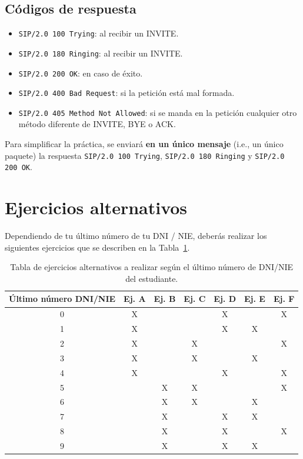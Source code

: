 \documentclass[a4paper,11pt]{article}
\begin{document}
\subsection*{Códigos de respuesta}

   \begin{itemize}
     \item \texttt{SIP/2.0 100 Trying}: al recibir un INVITE.
     \item \texttt{SIP/2.0 180 Ringing}: al recibir un INVITE.
     \item \texttt{SIP/2.0 200 OK}: en caso de éxito.
     \item \texttt{SIP/2.0 400 Bad Request}: si la petición está mal formada.
     \item \texttt{SIP/2.0 405 Method Not Allowed}: si se manda en la petición cualquier otro método diferente de INVITE, BYE o ACK.
   \end{itemize}

Para simplificar la práctica, se enviará {\bf en un único mensaje} (i.e., un único paquete) la respuesta \texttt{SIP/2.0 100 Trying}, \texttt{SIP/2.0 180 Ringing} y \texttt{SIP/2.0 200 OK}.


\section*{Ejercicios alternativos}

Dependiendo de tu último número de tu DNI / NIE, deberás realizar los siguientes ejercicios que se describen en la Tabla~\ref{tab:ejercicios}.

\begin{center}
  \begin{table}
    \center
    \begin{tabular}{| c | c | c | c | c | c | c |} \hline
    Último número DNI/NIE & Ej. A & Ej. B & Ej. C & Ej. D & Ej. E & Ej. F \\ \hline \hline
    0 & X &   &   & X &   & X \\ \hline
    1 & X &   &   & X & X &  \\ \hline
    2 & X &   & X &   &   & X \\ \hline
    3 & X &   & X &   & X &  \\ \hline
    4 & X &   &   & X &   & X \\ \hline
    5 &   & X & X &   &   & X \\ \hline
    6 &   & X & X &   & X & \\ \hline
    7 &   & X &   & X & X & \\ \hline
    8 &   & X &   & X &   & X  \\ \hline
    9 &   & X &   & X & X &  \\ \hline
    \end{tabular}
  \caption{Tabla de ejercicios alternativos a realizar según el último número de DNI/NIE del estudiante.}
  \label{tab:ejercicios}
  \end{table}
\end{center}
\end{document}
